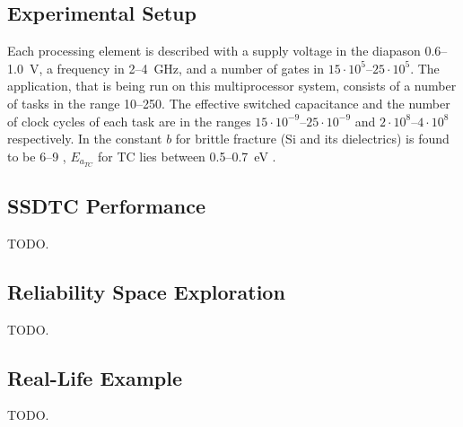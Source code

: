 \subsection{Experimental Setup}
Each processing element is described with a supply voltage in the diapason 0.6--1.0~V, a frequency in 2--4~GHz, and a number of gates in $15 \cdot 10^5$--$25 \cdot 10^5$. The application, that is being run on this multiprocessor system, consists of a number of tasks in the range 10--250. The effective switched capacitance and the number of clock cycles of each task are in the ranges $15 \cdot 10^{-9}$--$25 \cdot 10^{-9}$ and $2 \cdot 10^8$--$4 \cdot 10^8$ respectively. In  the constant $b$ for brittle fracture (Si and its dielectrics) is found to be 6--9 \cite{jedec2010}, $E_{a_{TC}}$ for TC lies between 0.5--0.7~eV \cite{vigrass}.

\subsection{SSDTC Performance}
TODO.

\subsection{Reliability Space Exploration}
TODO.

\subsection{Real-Life Example}
TODO.
